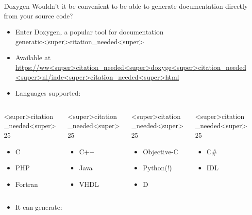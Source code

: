 \documentclass[11pt]{beamer}
\begin{document}
\begin{frame}[fragile=singleslide]{Doxygen}
Wouldn't it be convenient to be able to generate documentation directly from your source code? 
\begin{itemize}
\item Enter Doxygen, a popular tool for documentation generatio<super>citation_needed<super>
\item Available at \url{https://ww<super>citation_needed<super>doxyge<super>citation_needed<super>nl/inde<super>citation_needed<super>html}
\item Languages supported:
\end{itemize}
\begin{columns}
\begin{column}{<super>citation_needed<super>25\textwidth}
\begin{itemize}
\item C
\item PHP
\item Fortran
\end{itemize}
\end{column}
\begin{column}{<super>citation_needed<super>25\textwidth}
\begin{itemize}
\item C++
\item Java
\item VHDL
\end{itemize}
\end{column}
\begin{column}{<super>citation_needed<super>25\textwidth}
\begin{itemize}
\item Objective-C
\item Python(!)
\item D
\end{itemize}
\end{column}
\begin{column}{<super>citation_needed<super>25\textwidth}
\begin{itemize}
\item C\#
\item IDL
\end{itemize}
\vspace{1em}
\end{column}
\end{columns}
\vspace{<super>citation_needed<super>25em}
\begin{itemize}
\item It can generate:

\end{itemize}
\end{frame}
\end{document}
